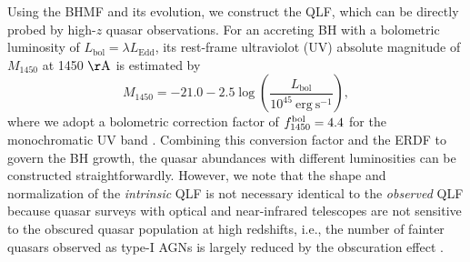 \documentclass[twocolumn, twocolappendix]{aastex63}
\newcommand{\Muv}{M_{1450}}
\newcommand{\Lbol}{L_\mathrm{bol}}
\begin{document}
\begin{CJK*}{UTF8}{gbsn}
Using the BHMF and its evolution, we construct the QLF, which can be directly probed by high-$z$ quasar observations.
For an accreting BH with a bolometric luminosity of $\Lbol=\lambda L_\mathrm{Edd}$, 
its rest-frame ultraviolot (UV) absolute magnitude of $\Muv$ at 1450 $\mathrm{\AA}$ is estimated by
\begin{equation}
  \label{eq:M1450}
  \Muv= -21.0-2.5 \log  \left(\frac{\Lbol}{10^{45}~\mathrm{erg~s}^{-1}} \right),
\end{equation}
%
where we adopt a bolometric correction factor of $f^{\rm bol}_{1450}=4.4$ for the monochromatic UV band 
\citep{2006ApJS..166..470R}.
Combining this conversion factor and the ERDF to govern the BH growth, the quasar abundances with different luminosities 
can be constructed straightforwardly.
However, we note that the shape and normalization of the {\it intrinsic} QLF is not necessary identical to the {\it observed} QLF
because quasar surveys with optical and near-infrared telescopes are not sensitive to the obscured quasar population at high redshifts,
i.e., the number of fainter quasars observed as type-I AGNs is largely reduced by the obscuration effect
\citep{2003ApJ...598..886U,2007A&A...463...79G,2008A&A...490..905H,2014ApJ...786..104U,2014MNRAS.437.3550M}. 



\end{CJK*}
\end{document}
